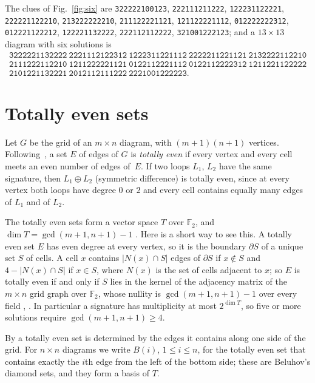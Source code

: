 \documentclass[11pt]{amsart}
\theoremstyle{remark}
\begin{document}
The clues of Fig.~\ref{fig:six} are
\texttt{322222100123}, \texttt{222111211222}, \texttt{122231122221}, \texttt{222221122210},
\texttt{213222222210}, \texttt{211122221121}, \texttt{121122221112}, \texttt{012222222312},
\texttt{012221122212}, \texttt{122221132222}, \texttt{222112112222}, \texttt{321001222123}; and a $13\times13$ diagram
with six solutions is
\begin{equation}\label{eq:six13}
\begin{array}{l}
\texttt{3222221132222}\ \texttt{2221112122312}\ \texttt{1222311221112}\ \texttt{2222211221121}\ \texttt{2132222112210}\\
\texttt{2111222112210}\ \texttt{1211222221121}\ \texttt{0122112221112}\ \texttt{0122112222312}\ \texttt{1211221122222}\\
\texttt{2101221132221}\ \texttt{2012112111222}\ \texttt{2221001222223}.
\end{array}
\end{equation}

\section{Totally even sets}
Let $G$ be the grid of an $m\times n$ diagram, with $(m+1)(n+1)$ vertices. Following~\cite[\S4]{beluhov}, a set $E$
of edges of $G$ is \emph{totally even} if every vertex and every cell meets an even number of edges of~$E$. If two
loops $L_1$, $L_2$ have the same signature, then $L_1\oplus L_2$ (symmetric difference) is totally even, since at
every vertex both loops have degree $0$ or $2$ and every cell contains equally many edges of $L_1$ and of $L_2$.

The totally even sets form a vector space $T$ over $\mathbb F_2$, and $\dim T=\gcd(m+1,n+1)-1$
\cite[\S4]{beluhov}. Here is a short way to see this. A totally even set $E$ has even degree at every vertex, so it
is the boundary $\partial S$ of a unique set $S$ of cells. A cell $x$ contains $|N(x)\cap S|$ edges of $\partial S$ if
$x\notin S$ and $4-|N(x)\cap S|$ if $x\in S$, where $N(x)$ is the set of cells adjacent to $x$; so $E$ is totally even
if and only if $S$ lies in the kernel of the adjacency matrix of the $m\times n$ grid graph over $\mathbb F_2$, whose
nullity is $\gcd(m+1,n+1)-1$ over every field \cite{tomei}, \cite[\S4]{beluhov}. In particular a signature has multiplicity at most $2^{\dim T}$, so five
or more solutions require $\gcd(m+1,n+1)\ge4$.

By \cite[Lemma~2]{beluhov} a totally even set is determined by the edges it contains along one side of the grid. For
$n\times n$ diagrams we write $B(i)$, $1\le i\le n$, for the totally even set that contains exactly the $i$th edge from
the left of the bottom side; these are Beluhov's diamond sets, and they form a basis of $T$.
\end{document}

